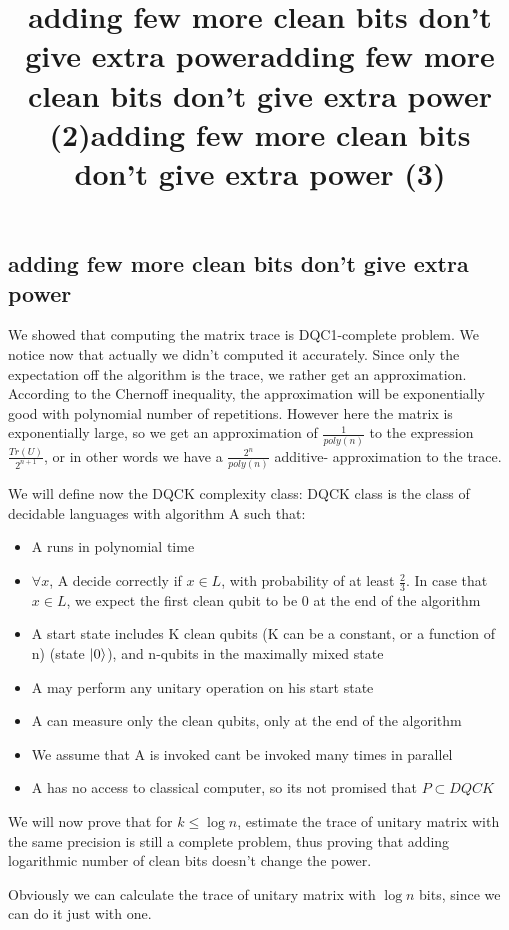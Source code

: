 \documentclass{article}
\begin{document}
\subsection{adding few more clean bits don't give extra power}
\title{adding few more clean bits don't give extra power}
We showed that computing the matrix trace is DQC1-complete problem.
We notice now that actually we didn't computed it accurately. Since only the expectation off the algorithm is the trace, we rather get an approximation. According to the Chernoff inequality, the approximation will be exponentially  good with polynomial number of repetitions. However here the matrix is exponentially large, so we get an approximation of $\frac{1}{poly(n)}$ to the expression $\frac{Tr(U)}{2^{n+1}}$, or  in other words we have a $\frac{2^{n}}{poly(n)}$ additive- approximation to the trace. 


\title{adding few more clean bits don't give extra power (2)}
We will define now the DQCK complexity class:
DQCK class is the class of decidable languages with algorithm A such that:
\begin{itemize}
\item A runs in polynomial time
\item $\forall x$, A decide correctly if $x \in L$, with probability of at least $\frac{2}{3}$. 
In case that $x \in L$, we expect the first clean qubit to be 0 at the end of the algorithm
\item A start state includes K clean qubits (K can be a constant, or a function of n) (state $\left\vert{0}\right\rangle$), and n-qubits in the maximally mixed state
\item A may perform any unitary operation on his start state
\item A can measure only the clean qubits, only at the end of the algorithm
\item We assume that A is invoked cant be invoked many times in parallel
\item A has no access to classical computer, so its not promised that $P \subset DQCK$ 
\end{itemize}  


\title{adding few more clean bits don't give extra power (3)}
We will now prove that for $k \leq \log{n}$, estimate the trace of unitary matrix with the same precision is still a complete problem, thus proving that adding logarithmic number of clean bits doesn't change the power. 

Obviously we can calculate the trace of unitary matrix with $\log{n}$ bits, since we can do it just with one. 
\end{document}
